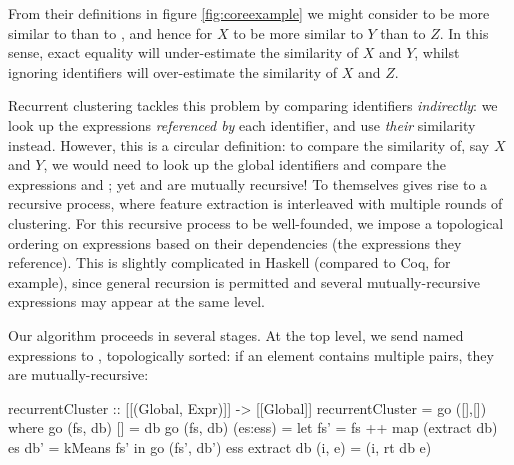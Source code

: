 From their definitions in figure \ref{fig:coreexample} we might consider  to be more similar to  than to , and hence for $X$ to be more similar to $Y$ than to $Z$. In this sense, exact equality will under-estimate the similarity of $X$ and $Y$, whilst ignoring identifiers will over-estimate the similarity of $X$ and $Z$.

Recurrent clustering tackles this problem by comparing identifiers \emph{indirectly}: we look up the expressions \emph{referenced by} each identifier, and use \emph{their} similarity instead. However, this is a circular definition: to compare the similarity of, say $X$ and $Y$, we would need to look up the global identifiers and compare the expressions  and ; yet  and  are mutually recursive! To  themselves gives rise to a recursive process, where feature extraction is interleaved with multiple rounds of clustering. For this recursive process to be well-founded, we impose a topological ordering on expressions based on their dependencies (the expressions they reference). This is slightly complicated in Haskell (compared to Coq, for example), since general recursion is permitted and several mutually-recursive expressions may appear at the same level.

\iffalse TODO: the code should go in the implementation section rather than here \fi
\iffalse TODO: give a more abstract presentation, using mathematical notation \fi
\iffalse TODO: maybe focus on the ``interesting cases'', and defer the nitty-gritty of extending the environment, etc. to the implementation section? \fi
\iffalse TODO: Define rose trees \fi
\iffalse TODO: Show an example from earlier, e.g. factorial \fi
\iffalse TODO: Split into three parts: expressions to rose trees of features; rose trees to matrices to vectors; k-means clustering \fi
\iffalse TODO: highlight the recurrent nature of the algorithm \fi
\iffalse TODO: I would probably just restructure:
 - start with the syntax, get to show how, for every line of figure 1, extraction works
 - then transformation to feature vectors
 - then k-means
obviously, they are mutually recursive...
\fi

Our algorithm proceeds in several stages. At the top level, we send named expressions to , topologically sorted: if an element contains multiple  pairs, they are mutually-recursive:

\begin{haskell}
recurrentCluster :: [[(Global, Expr)]] -> [[Global]]
recurrentCluster = go ([],[])
  where go (fs, db) []       = db
        go (fs, db) (es:ess) = let fs' = fs ++ map (extract db) es
                                   db' = kMeans fs'
                                in go (fs', db') ess
        extract db (i, e) = (i, rt db e)
\end{haskell}

